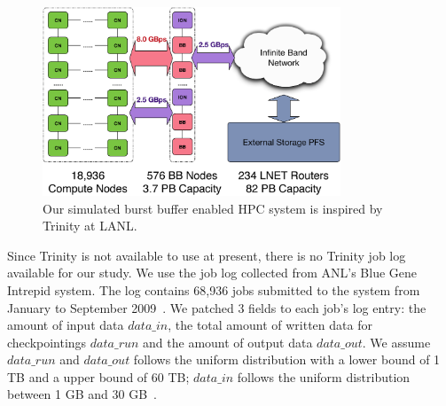 \begin{figure}[htp]
        \centering
        \includegraphics[width=3.5in]{BBArchitecturewithBandwidth}
        \caption{Our simulated burst buffer enabled HPC system is inspired by Trinity at LANL.}
        \label{Fig:BBArchitecture}
\end{figure}



Since Trinity is not available to use at present, 
there is no Trinity job log available for our study.
We use the job log collected from ANL's Blue Gene Intrepid system. The log contains 68,936 jobs
submitted to the system from January to September 2009~\cite{Tang:IPDPS:2010}.
We patched 3 fields to each job's log entry: the amount of input data $data\_in$,
the total amount of written data for checkpointings $data\_run$
and the amount of output data $data\_out$.
We assume $data\_run$ and $data\_out$ follows the uniform distribution with a
lower bound of 1 TB and a upper bound of 60 TB;
$data\_in$ follows the uniform distribution between 1 GB and 30 GB~\cite{Liu:MSST:2012}.




